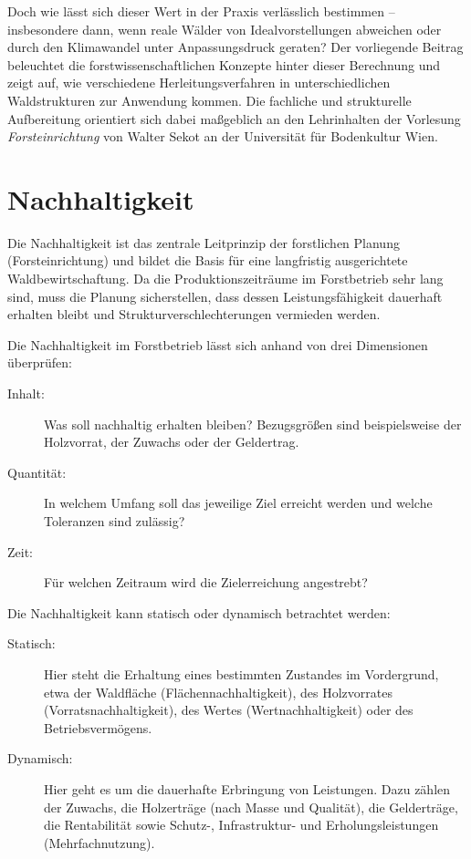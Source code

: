 \documentclass[twocolumn, paper=a4, fontsize=10pt]{scrartcl}
\begin{document}
Doch wie lässt sich dieser Wert in der Praxis verlässlich bestimmen -- insbesondere dann, wenn reale Wälder von Idealvorstellungen abweichen oder durch den Klimawandel unter Anpassungsdruck geraten? Der vorliegende Beitrag beleuchtet die forstwissenschaftlichen Konzepte hinter dieser Berechnung und zeigt auf, wie verschiedene Herleitungsverfahren in unterschiedlichen Waldstrukturen zur Anwendung kommen. Die fachliche und strukturelle Aufbereitung orientiert sich dabei maßgeblich an den Lehrinhalten der Vorlesung \emph{Forsteinrichtung} von Walter Sekot an der Universität für Bodenkultur Wien.

\section{Nachhaltigkeit}

Die Nachhaltigkeit ist das zentrale Leitprinzip der forstlichen Planung (Forsteinrichtung) und bildet die Basis für eine langfristig ausgerichtete Waldbewirtschaftung. Da die Produktionszeiträume im Forstbetrieb sehr lang sind, muss die Planung sicherstellen, dass dessen Leistungsfähigkeit dauerhaft erhalten bleibt und Strukturverschlechterungen vermieden werden.

Die Nachhaltigkeit im Forstbetrieb lässt sich anhand von drei Dimensionen überprüfen:
\begin{description}
\item[Inhalt:] Was soll nachhaltig erhalten bleiben? Bezugsgrößen sind beispielsweise der Holzvorrat, der Zuwachs oder der Geldertrag.
\item[Quantität:] In welchem Umfang soll das jeweilige Ziel erreicht werden und welche Toleranzen sind zulässig?
\item[Zeit:] Für welchen Zeitraum wird die Zielerreichung angestrebt?
\end{description}

Die Nachhaltigkeit kann statisch oder dynamisch betrachtet werden:
\begin{description}
\item[Statisch:] Hier steht die Erhaltung eines bestimmten Zustandes im Vordergrund, etwa der Waldfläche (Flächennachhaltigkeit), des Holzvorrates (Vorratsnachhaltigkeit), des Wertes (Wertnachhaltigkeit) oder des Betriebsvermögens.
\item[Dynamisch:] Hier geht es um die dauerhafte Erbringung von Leistungen. Dazu zählen der Zuwachs, die Holzerträge (nach Masse und Qualität), die Gelderträge, die Rentabilität sowie Schutz-, Infrastruktur- und Erholungsleistungen (Mehrfachnutzung).
\end{description}
\end{document}
